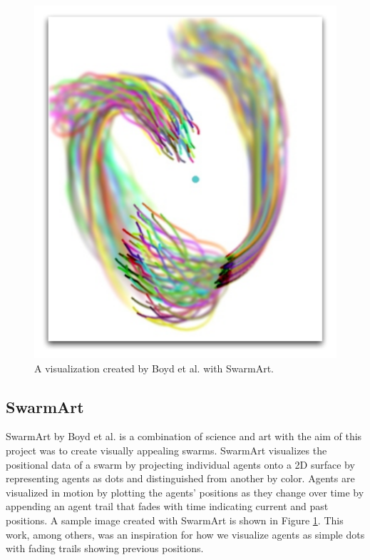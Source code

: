\documentclass[conference]{IEEEtran}
\begin{document}
\begin{figure}
\centering
\includegraphics[scale=.3]{images/SwarmArt.pdf}
\caption{A visualization created by Boyd et al. with SwarmArt\cite{Boyd}.}
\label{SwarmArt}
\end{figure}

\subsection{SwarmArt}
SwarmArt by Boyd et al.\cite{Boyd} is a combination of science and art with
the aim of this project was to create visually appealing swarms.
SwarmArt visualizes the positional data of a swarm by projecting individual
agents onto a 2D surface by representing agents as dots and distinguished from another by color.
Agents are visualized in motion by plotting the agents' positions as they change over time by
appending an agent trail that fades with time indicating current and past positions.
A sample image created with SwarmArt is shown in Figure \ref{SwarmArt}.
This work, among others\cite{codeswarm:website},
was an inspiration for how we visualize agents as simple dots with fading trails
showing previous positions.
\end{document}
